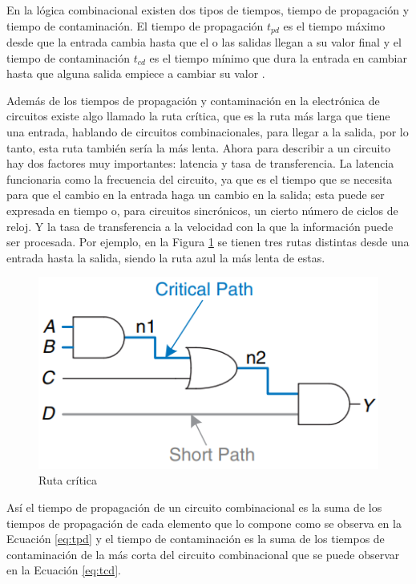 \documentclass[journal]{IEEEtran}
\begin{document}
	En la lógica combinacional existen dos tipos de tiempos, tiempo de propagación y tiempo de contaminación. El tiempo de propagación $t_{pd}$ es el tiempo máximo desde que la entrada cambia hasta que el o las salidas llegan a su valor final y el tiempo de contaminación $t_{cd}$ es el tiempo mínimo que dura la entrada en cambiar hasta que alguna salida empiece a cambiar su valor \cite{SarahL.Harris2010}.
	
	Además de los tiempos de propagación y contaminación en la electrónica de circuitos existe algo llamado la ruta crítica, que es la ruta más larga que tiene una entrada, hablando de circuitos combinacionales, para llegar a la salida, por lo tanto, esta ruta también sería la más lenta. Ahora para describir a un circuito hay dos factores muy importantes: latencia y tasa de transferencia. La latencia funcionaria como la frecuencia del circuito, ya que es el tiempo que se necesita para que el cambio en la entrada haga un cambio en la salida; esta puede ser expresada en tiempo o, para circuitos sincrónicos, un cierto número de ciclos de reloj.  Y la tasa de transferencia a la velocidad con la que la información puede ser procesada. Por ejemplo, en la Figura \ref{fig:criticalpath} se tienen tres rutas distintas desde una entrada hasta la salida, siendo la ruta azul la más lenta de estas.
	
	\begin{figure}[hbtp]
		\centering
		\includegraphics[scale = 0.4]{img/criticalpath.png}
		\caption{Ruta crítica \cite{SarahL.Harris2010}}
		\label{fig:criticalpath}
	\end{figure}

	Así el tiempo de propagación de un circuito combinacional es la suma de los tiempos de propagación de cada elemento que lo compone como se observa en la Ecuación \ref{eq:tpd} y el tiempo de contaminación es la suma de los tiempos de contaminación de la más corta del circuito combinacional que se puede observar en la Ecuación \ref{eq:tcd}.
	
\end{document}
